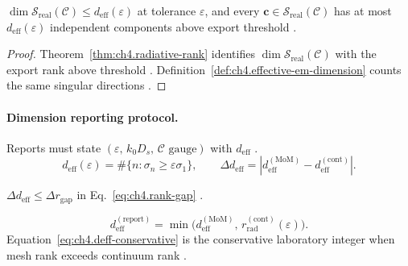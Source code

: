 \begin{theorem}
\label{thm:ch4.dimension-bounds-realizability}
\(\dim\mathcal{S}_{\mathrm{real}}(\mathcal{C})\le d_{\mathrm{eff}}(\varepsilon)\) at tolerance \(\varepsilon\), and every
\(\mathbf{c}\in\mathcal{S}_{\mathrm{real}}(\mathcal{C})\) has at most \(d_{\mathrm{eff}}(\varepsilon)\) independent components above export
threshold \cite{stratton1941,harrington2001,devaney2004,hansen1988}.
\end{theorem}
\begin{proof}
Theorem~\ref{thm:ch4.radiative-rank} identifies \(\dim\mathcal{S}_{\mathrm{real}}(\mathcal{C})\) with the export rank above threshold
\cite{harrington2001}. Definition~\ref{def:ch4.effective-em-dimension} counts the same singular directions \cite{stratton1941}.
\end{proof}

\paragraph{Dimension reporting protocol.}
Reports must state \((\varepsilon,\,k_{0}D_{s},\,\mathcal{C}\text{ gauge})\) with \(d_{\mathrm{eff}}\)
\cite{hansen1988,stratton1941,harrington2001}.
\begin{equation}
\label{eq:ch4.deff-reporting}
d_{\mathrm{eff}}(\varepsilon)=\#\{n:\sigma_{n}\ge\varepsilon\sigma_{1}\},\qquad
\Delta d_{\mathrm{eff}}=|d_{\mathrm{eff}}^{\mathrm{(MoM)}}-d_{\mathrm{eff}}^{\mathrm{(cont)}}|.
\end{equation}
\begin{corollary}
\label{cor:ch4.deff-mesh-gap}
\(\Delta d_{\mathrm{eff}}\le\Delta r_{\mathrm{gap}}\) in Eq.~\eqref{eq:ch4.rank-gap} \cite{harrington2001,devaney2004,stratton1941}.
\end{corollary}
\begin{equation}
\label{eq:ch4.deff-conservative}
d_{\mathrm{eff}}^{\mathrm{(report)}}=\min\big(d_{\mathrm{eff}}^{\mathrm{(MoM)}},\,r_{\mathrm{rad}}^{\mathrm{(cont)}}(\varepsilon)\big).
\end{equation}
Equation~\eqref{eq:ch4.deff-conservative} is the conservative laboratory integer when mesh rank exceeds continuum rank
\cite{hansen1988,harrington2001}.

